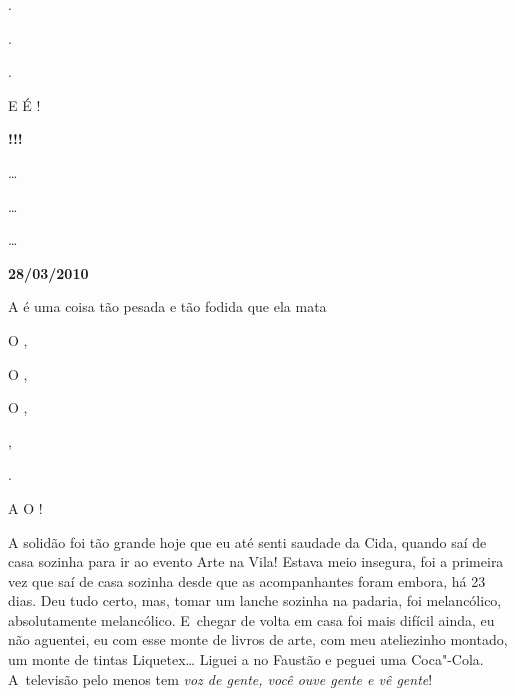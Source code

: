  .

 .

 .

E  É  !

    \textbf{!!!}

 …

 …

 …

\begin{center}\textbf{\asterisc{}}\end{center}


\begin{flushright}\textbf{}\end{flushright}

 \begin{flushright}\textbf{28/03/2010}\end{flushright}



A  é uma coisa tão pesada e tão fodida que ela mata

O   ,

O   ,

O   ,

     ,

    .

A    O      !

A solidão foi tão grande hoje que eu até senti saudade da Cida, quando
saí de casa sozinha para ir ao evento Arte na Vila! Estava meio
insegura, foi a primeira vez que saí de casa sozinha desde que as
acompanhantes foram embora, há 23 dias. Deu tudo certo, mas, tomar um
lanche sozinha na padaria, foi melancólico, absolutamente melancólico. E~chegar de volta em casa foi mais difícil ainda, eu não aguentei, eu com
esse monte de livros de arte, com meu ateliezinho montado, um monte de
tintas Liquetex… Liguei a  no Faustão e peguei uma Coca"-Cola. A~televisão pelo menos tem \emph{voz de gente, você ouve gente e vê
gente}!

